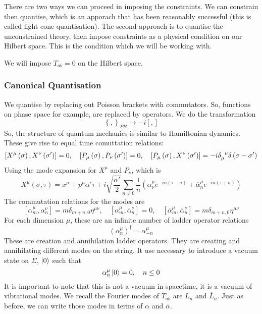 \documentclass[11pt, oneside]{article}   	%
\theoremstyle{slanted}
\begin{document}
There are two ways we can proceed in imposing 
the constraints. 
We can constrain then quantise, which 
is an apporach that has been reasonably successful
(this is called light-cone quantisation). 
The second approach is 
to quantise the unconstrained 
theory, then impose constraints 
as a physical condition 
on our Hilbert space. 
This is the condition which we will be 
working with.

We will impose $ T _{ ab }  = 0 $  
on the Hilbert space.

\subsubsection{Canonical Quantisation}
We quantise by 
replacing out Poisson brackets 
with commutators. So, functions on phase 
space for example, are replaced by operators. 
We do the transformation 
\[
 \left\{  ,  \right\}  _{ P B  }  \to  - i \left[  ,  \right] 
\] So, the structure 
of quantum mechanics is 
similar to Hamiltonian dynamics. 
These give rise to equal time comuttation 
relations: 
\[
	\left[  X ^ \mu \left( \sigma \right) , X ^ \nu \left( \sigma '  \right)    \right]   = 0 , \quad \left[  P _ \mu \left( \sigma  \right)  , 
	P _ \nu \left( \sigma '  \right)   \right]   = 0 , \quad 
	\left[  P _ \mu \left( \sigma  \right)  , 
	X ^ \nu \left(  \sigma '  \right)  \right]   =  - i \delta 
	\indices{ _ \mu ^ \nu  } \delta \left( \sigma - \sigma '  \right)   
\] Using 
the mode expansion for $ X ^ \mu $ and $ P _ \nu $, 
which is 
\[
 X ^ \mu \left( \sigma , \tau  \right)   = 
 x ^ \mu + p ^ \mu \alpha ' \tau + i \sqrt{ \frac{ \alpha ' }{ 2 } }  
 \sum _{ n \neq 0   } \frac{1}{n } \left( \alpha _ \nu ^ \mu 
 e ^{  - i n \left( \tau  - \sigma  \right)  } + \overline{ \alpha } _ n ^ \mu 
  e^{  - i n \left( \tau + \sigma  \right) }\right) 
\] The commutation 
relations for the modes are 
\[
 \left[  \alpha _ m ^ \mu , \alpha _ n ^ \nu  \right]   =
 m \delta _{ m + n , 0 } \eta ^{ \mu \nu } , \quad 
 \left[  \alpha _ m ^ \mu , \overline{ \alpha } _ n ^ \nu  \right]   = 0 , 
 \quad \left[  \overline{ \alpha }_ m ^ \mu , \overline{ \alpha } _ n ^ \nu  \right] 
  = m \delta_{ m +  n , 0 }\eta ^{ \mu \nu } 
\] For each 
dimension $ \mu $, these are an 
infinite number of ladder operator relations 
\[
 \left( \alpha_ n ^ \mu  \right)  ^{ \dagger }  = \alpha _{  -n } ^ \mu 
\] These are 
creation and annihilation ladder 
operators. 
They are creating and annihilating 
different modes on the string. 
It use necessary to 
introduce a vacuum state on $ \Sigma $, 
$ \ket{ 0 } $ such that 
\[
 \alpha _ n ^ \mu \ket{ 0 }  = 0, \quad n \leq 0 
\] It is 
important to note that this is not a vacuum in spacetime, 
it is a vacuum of vibrational modes. 
We recall the 
Fourier modes of $ T _{ ab } $
are $ L _ n $ and $ \overline{ L } _ n $. 
Just as before, 
we can write those modes in terms of $ \alpha $ and $ \overline{ \alpha } $. 
\end{document}
